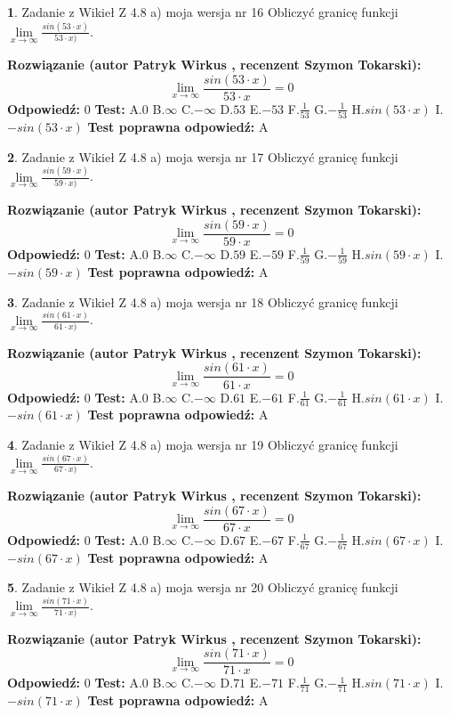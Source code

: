\documentclass[12pt, a4paper]{article}
\theoremstyle{definition} %
\newtheorem{zad}{}
\newcommand{\zadStart}[1]{\begin{zad}#1\newline}
\newcommand{\zadStop}{\end{zad}}
\newcommand{\rozwStart}[2]{\noindent \textbf{Rozwiązanie (autor #1 , recenzent #2): }\newline}
\newcommand{\rozwStop}{\newline}
\newcommand{\odpStart}{\noindent \textbf{Odpowiedź:}\newline}
\newcommand{\odpStop}{\newline}
\newcommand{\testStart}{\noindent \textbf{Test:}\newline}
\newcommand{\testStop}{\newline}
\newcommand{\kluczStart}{\noindent \textbf{Test poprawna odpowiedź:}\newline}
\newcommand{\kluczStop}{\newline}
\begin{document}
\zadStart{Zadanie z Wikieł Z 4.8 a) moja wersja nr 16}
Obliczyć granicę funkcji $\lim\limits_{x\to \infty}\frac{sin(53\cdot x)}{53\cdot x)}$.
\zadStop
\rozwStart{Patryk Wirkus}{Szymon Tokarski}
$$\lim\limits_{x\to \infty}\frac{sin(53\cdot x)}{53\cdot x}=
0$$
\rozwStop
\odpStart
$0$
\odpStop
\testStart
A.$0$ B.$\infty$ C.$-\infty$ D.$53$ E.$-53$
F.$\frac{1}{53}$ G.$-\frac{1}{53}$
H.$sin(53\cdot x)$
I.$-sin(53\cdot x)$
\testStop
\kluczStart
A
\kluczStop



\zadStart{Zadanie z Wikieł Z 4.8 a) moja wersja nr 17}
Obliczyć granicę funkcji $\lim\limits_{x\to \infty}\frac{sin(59\cdot x)}{59\cdot x)}$.
\zadStop
\rozwStart{Patryk Wirkus}{Szymon Tokarski}
$$\lim\limits_{x\to \infty}\frac{sin(59\cdot x)}{59\cdot x}=
0$$
\rozwStop
\odpStart
$0$
\odpStop
\testStart
A.$0$ B.$\infty$ C.$-\infty$ D.$59$ E.$-59$
F.$\frac{1}{59}$ G.$-\frac{1}{59}$
H.$sin(59\cdot x)$
I.$-sin(59\cdot x)$
\testStop
\kluczStart
A
\kluczStop



\zadStart{Zadanie z Wikieł Z 4.8 a) moja wersja nr 18}
Obliczyć granicę funkcji $\lim\limits_{x\to \infty}\frac{sin(61\cdot x)}{61\cdot x)}$.
\zadStop
\rozwStart{Patryk Wirkus}{Szymon Tokarski}
$$\lim\limits_{x\to \infty}\frac{sin(61\cdot x)}{61\cdot x}=
0$$
\rozwStop
\odpStart
$0$
\odpStop
\testStart
A.$0$ B.$\infty$ C.$-\infty$ D.$61$ E.$-61$
F.$\frac{1}{61}$ G.$-\frac{1}{61}$
H.$sin(61\cdot x)$
I.$-sin(61\cdot x)$
\testStop
\kluczStart
A
\kluczStop



\zadStart{Zadanie z Wikieł Z 4.8 a) moja wersja nr 19}
Obliczyć granicę funkcji $\lim\limits_{x\to \infty}\frac{sin(67\cdot x)}{67\cdot x)}$.
\zadStop
\rozwStart{Patryk Wirkus}{Szymon Tokarski}
$$\lim\limits_{x\to \infty}\frac{sin(67\cdot x)}{67\cdot x}=
0$$
\rozwStop
\odpStart
$0$
\odpStop
\testStart
A.$0$ B.$\infty$ C.$-\infty$ D.$67$ E.$-67$
F.$\frac{1}{67}$ G.$-\frac{1}{67}$
H.$sin(67\cdot x)$
I.$-sin(67\cdot x)$
\testStop
\kluczStart
A
\kluczStop



\zadStart{Zadanie z Wikieł Z 4.8 a) moja wersja nr 20}
Obliczyć granicę funkcji $\lim\limits_{x\to \infty}\frac{sin(71\cdot x)}{71\cdot x)}$.
\zadStop
\rozwStart{Patryk Wirkus}{Szymon Tokarski}
$$\lim\limits_{x\to \infty}\frac{sin(71\cdot x)}{71\cdot x}=
0$$
\rozwStop
\odpStart
$0$
\odpStop
\testStart
A.$0$ B.$\infty$ C.$-\infty$ D.$71$ E.$-71$
F.$\frac{1}{71}$ G.$-\frac{1}{71}$
H.$sin(71\cdot x)$
I.$-sin(71\cdot x)$
\testStop
\kluczStart
A
\kluczStop
\end{document}
